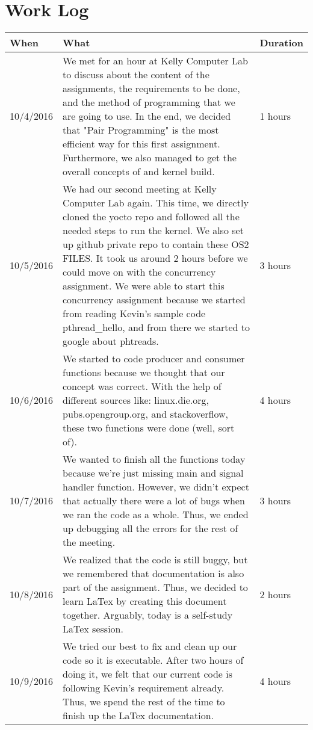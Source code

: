 \documentclass[letterpaper,10pt,draftclsnofoot,titlepage,onecolumn]{IEEEtran}
\begin{document}
\clearpage

\section{Work Log}
\begin{center}
\begin{tabular}{ |m{2cm}|m{10cm}|m{2cm}| }
\hline
When & What & Duration \\ \hline
10/4/2016 & We met for an hour at Kelly Computer Lab to discuss about the content of the assignments, the requirements to be done, and the method of programming that we are going to use. In the end, we decided that "Pair Programming" is the most efficient way for this first assignment. Furthermore, we also managed to get the overall concepts of  and kernel build. & 1 hours\\ \hline
10/5/2016 & We had our second meeting at Kelly Computer Lab again. This time, we directly cloned the yocto repo and followed all the needed steps to run the kernel. We also set up github private repo to contain these OS2 FILES. It took us around 2 hours before we could move on with the concurrency assignment. We were able to start this concurrency assignment because we started from reading Kevin's sample code pthread\_hello, and from there we started to google about phtreads. & 3 hours\\ \hline
10/6/2016 & We started to code producer and consumer functions because we thought that our concept was correct. With the help of different sources like: linux.die.org, pubs.opengroup.org, and stackoverflow, these two functions were done (well, sort of). & 4 hours\\ \hline
10/7/2016 & We wanted to finish all the functions today because we're just missing main and signal handler function. However, we didn't expect that actually there were a lot of bugs when we ran the code as a whole. Thus, we ended up debugging all the errors for the rest of the meeting. & 3 hours\\ \hline
10/8/2016 & We realized that the code is still buggy, but we remembered that documentation is also part of the assignment. Thus, we decided to learn LaTex by creating this document together. Arguably, today is a self-study LaTex session. & 2 hours\\ \hline
10/9/2016 & We tried our best to fix and clean up our code so it is executable. After two hours of doing it, we felt that our current code is following Kevin's requirement already. Thus, we spend the rest of the time to finish up the LaTex documentation. & 4 hours\\
\hline
\end{tabular}
\end{center}
\end{document}
